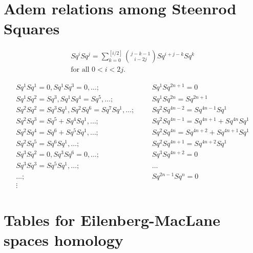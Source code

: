 {
\appendix


\theoremstyle{plain}
\newtheorem{Athm}{Theorem}[chapter]
\newtheorem*{Athm*}{Theorem}
\newtheorem{Alem}[Athm]{Lemma}
\newtheorem{Aprop}[Athm]{Proposition}
\newtheorem{Acor}[Athm]{Corollary}
\newtheorem*{Acor*}{Corollary}

\theoremstyle{definition}
\newtheorem{Adefn}{Definition}[chapter]
\newtheorem{Anota}{Notation}[chapter]
\newtheorem{Aconv}{Convention}[chapter]
\newtheorem{Aconj}{Conjecture}[chapter]
\newtheorem{Aexmp}{Example}[chapter]

\theoremstyle{remark}
\newtheorem*{Arem}{Remark}
\newtheorem*{Anote}{Note}
\chapter{Adem relations among Steenrod Squares}\label{a:Adem relations}

\begin{align*}
Sq^iSq^j=\sum_{k=0}^{[i/2]}\binom{j-k-1}{i-2j}Sq^{i+j-k}Sq^k\\
\text{for all $0<i<2j$.}
\end{align*}

\bigskip
\begin{align*}
Sq^1Sq^1=0, Sq^1Sq^3=0,\dots; &&&Sq^1Sq^{2n+1}=0\\
Sq^1Sq^2=Sq^3,Sq^1Sq^4=Sq^5,\dots; &&&Sq^1Sq^{2n}=Sq^{2n+1}\\
Sq^2Sq^2=Sq^3Sq^1, Sq^2Sq^6=Sq^7Sq^1,\dots; &&&Sq^2Sq^{4n-2}=Sq^{4n-1}Sq^1\\
Sq^2Sq^3=Sq^5+Sq^4Sq^1,\dots; &&&Sq^2Sq^{4n-1}=Sq^{4n+1}+Sq^{4n}Sq^1\\
Sq^2Sq^4=Sq^6+Sq^5Sq^1,\dots; &&&Sq^{2}Sq^{4n}=Sq^{4n+2}+Sq^{4n+1}Sq^1\\
Sq^2Sq^5=Sq^6Sq^1,\dots; &&&Sq^2Sq^{4n+1}=Sq^{4n+2}Sq^1\\
Sq^3Sq^2=0, Sq^3Sq^6=0,\dots; &&&Sq^3Sq^{4n+2}=0\\
Sq^3Sq^3=Sq^5Sq^1,\dots; &&&\dots\\
\dots;&&&Sq^{2n-1}Sq^n=0\\
\vdots
\end{align*}

\chapter{Tables for Eilenberg-MacLane spaces homology}\label{a:tables}

}

